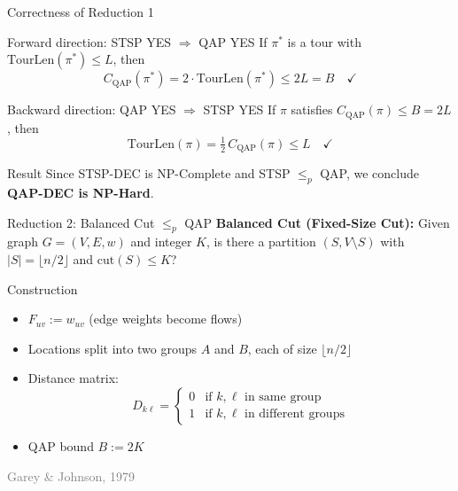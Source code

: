 \documentclass[aspectratio=169,11pt]{beamer}
\newcommand{\reference}[1]{\hfill{\scriptsize\textcolor{gray}{#1}}}
\begin{document}
\begin{frame}{Correctness of Reduction 1}
\begin{block}{Forward direction: STSP YES $\Rightarrow$ QAP YES}
If $\pi^*$ is a tour with $\mathrm{TourLen}(\pi^*)\le L$, then
\[
  C_{\text{QAP}}(\pi^*) = 2\cdot\mathrm{TourLen}(\pi^*) \le 2L = B \quad\checkmark
\]
\end{block}
\begin{block}{Backward direction: QAP YES $\Rightarrow$ STSP YES}
If $\pi$ satisfies $C_{\text{QAP}}(\pi)\le B=2L$, then
\[
  \mathrm{TourLen}(\pi) = \tfrac{1}{2}\,C_{\text{QAP}}(\pi) \le L \quad\checkmark
\]
\end{block}
\vspace{4pt}
\begin{alertblock}{Result}
Since STSP-DEC is NP-Complete and STSP $\le_p$ QAP, we conclude \textbf{QAP-DEC is NP-Hard}.
\end{alertblock}
\end{frame}

\begin{frame}{Reduction 2: Balanced Cut $\le_p$ QAP}
\textbf{Balanced Cut (Fixed-Size Cut):}
Given graph $G=(V,E,w)$ and integer $K$, is there a partition
$(S,V\!\setminus\!S)$ with $|S|=\lfloor n/2\rfloor$ and $\mathrm{cut}(S)\le K$?

\vspace{6pt}
\begin{block}{Construction}
\begin{itemize}
  \item $F_{uv} := w_{uv}$ \quad (edge weights become flows)
  \item Locations split into two groups $A$ and $B$, each of size $\lfloor n/2\rfloor$
  \item Distance matrix:
    \[
      D_{k\ell} = \begin{cases}
        0 & \text{if } k,\ell \text{ in same group}\\
        1 & \text{if } k,\ell \text{ in different groups}
      \end{cases}
    \]
  \item QAP bound $B := 2K$
\end{itemize}
\end{block}
\reference{Garey \& Johnson, 1979}
\end{frame}

\end{document}
